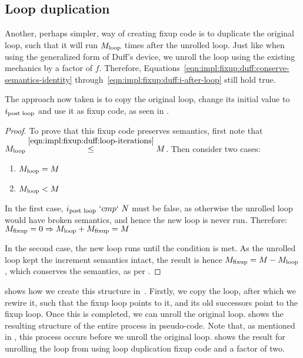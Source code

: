 







\subsection{Loop duplication}\label{sec:impl:fixup:loop}

Another, perhaps simpler, way of creating fixup code is to duplicate the original loop, such that it will run $M_{\text{loop}}$ times after the unrolled loop.
Just like when using the generalized form of Duff's device, we unroll the loop using the existing mechanics by a factor of $f$.
Therefore, Equations~\ref{eqn:impl:fixup:duff:conserve-semantics-identity} through~\ref{eqn:impl:fixup:duff:i-after-loop} still hold true.

The approach now taken is to copy the original loop, change its initial value to $i_\text{post loop}$ and use it as fixup code, as seen in .



\begin{proof}
    To prove that this fixup code preserves semantics, first note that $M_{\text{loop}} \overset{\ref{eqn:impl:fixup:duff:loop-iterations}}{\leq} M$.
    Then consider two cases:
    \begin{enumerate}
        \item $M_{\text{loop}} = M$
        \item $M_{\text{loop}} < M$
    \end{enumerate}
    In the first case, $i_\text{post loop}~`cmp`~N$ must be false, as otherwise the unrolled loop would have broken semantics, and hence the new loop is never run.
    Therefore: $M_{\text{fixup}} = 0 \Rightarrow M_{\text{loop}} + M_{\text{fixup}} = M$

    In the second case, the new loop runs until the condition is met.
    As the unrolled loop kept the increment semantics intact, the result is hence $M_{\text{fixup}} = M - M_{\text{loop}}$, which conserves the semantics, as per .
\end{proof}

 shows how we create this structure in~\libFIRM.
Firstly, we copy the loop, after which we rewire it, such that the fixup loop points to it, and its old successors point to the fixup loop.
Once this is completed, we can unroll the original loop.
 shows the resulting structure of the entire process in pseudo-code.
Note that, as mentioned in , this process occurs before we unroll the original loop.
 shows the result for unrolling the loop from  using loop duplication fixup code and a factor of two.

